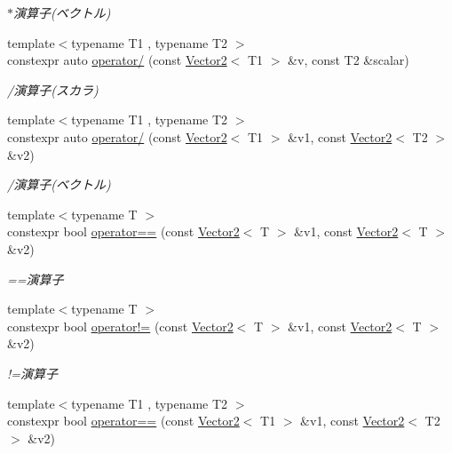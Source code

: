 \begin{DoxyCompactItemize}
\begin{DoxyCompactList}\small\item\em $\ast$演算子(ベクトル) \end{DoxyCompactList}\item 
{\footnotesize template$<$typename T1 , typename T2 $>$ }\\constexpr auto \mbox{\hyperlink{namespacesaki_a43404fc455816a29474cce93fc5cff50}{operator/}} (const \mbox{\hyperlink{classsaki_1_1_vector2}{Vector2}}$<$ T1 $>$ \&v, const T2 \&scalar)
\begin{DoxyCompactList}\small\item\em /演算子(スカラ) \end{DoxyCompactList}\item 
{\footnotesize template$<$typename T1 , typename T2 $>$ }\\constexpr auto \mbox{\hyperlink{namespacesaki_a6af4b5a4a56add022ed5bfde525d5979}{operator/}} (const \mbox{\hyperlink{classsaki_1_1_vector2}{Vector2}}$<$ T1 $>$ \&v1, const \mbox{\hyperlink{classsaki_1_1_vector2}{Vector2}}$<$ T2 $>$ \&v2)
\begin{DoxyCompactList}\small\item\em /演算子(ベクトル) \end{DoxyCompactList}\item 
{\footnotesize template$<$typename T $>$ }\\constexpr bool \mbox{\hyperlink{namespacesaki_aebe3f4c69f62ec8edc68723c5194c3b9}{operator==}} (const \mbox{\hyperlink{classsaki_1_1_vector2}{Vector2}}$<$ T $>$ \&v1, const \mbox{\hyperlink{classsaki_1_1_vector2}{Vector2}}$<$ T $>$ \&v2)
\begin{DoxyCompactList}\small\item\em ==演算子 \end{DoxyCompactList}\item 
{\footnotesize template$<$typename T $>$ }\\constexpr bool \mbox{\hyperlink{namespacesaki_a6ff1956703c2dfeebb0d188d9c34b033}{operator!=}} (const \mbox{\hyperlink{classsaki_1_1_vector2}{Vector2}}$<$ T $>$ \&v1, const \mbox{\hyperlink{classsaki_1_1_vector2}{Vector2}}$<$ T $>$ \&v2)
\begin{DoxyCompactList}\small\item\em !=演算子 \end{DoxyCompactList}\item 
{\footnotesize template$<$typename T1 , typename T2 $>$ }\\constexpr bool \mbox{\hyperlink{namespacesaki_a033d4b861140a6c00a8cb56ad71d463a}{operator==}} (const \mbox{\hyperlink{classsaki_1_1_vector2}{Vector2}}$<$ T1 $>$ \&v1, const \mbox{\hyperlink{classsaki_1_1_vector2}{Vector2}}$<$ T2 $>$ \&v2)

\end{DoxyCompactItemize}
